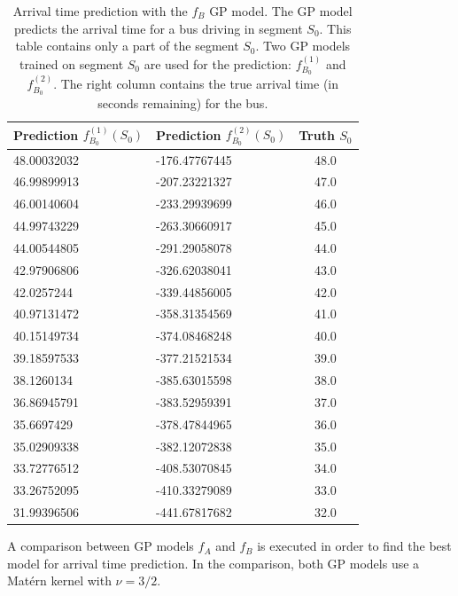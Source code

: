 \begin{table}
    \centering
    \caption[Arrival time prediction with the $f_B$ GP model]%
    {{\small Arrival time prediction with the $f_B$ GP model.
    The GP model predicts the arrival time for a bus driving in segment $S_0$.
    This table contains only a part of the segment $S_0$.
    Two GP models trained on segment $S_0$ are used for the prediction: $f^{(1)}_{B_0}$ and $f^{(2)}_{B_0}$.
    The right column contains the true arrival time (in seconds remaining) for the bus.}}
    \label{table:f_B-examples} 
    \begin{tabular}{ |l|l|c| } 
        \hline
        Prediction $f^{(1)}_{B_0}(S_0)$ & Prediction $f^{(2)}_{B_0}(S_0)$ & Truth $S_0$ \\ [0.5ex] 
        \hline
        48.00032032 & -176.47767445 & 48.0 \\
        46.99899913 & -207.23221327 & 47.0 \\
        46.00140604 & -233.29939699 & 46.0 \\
        44.99743229 & -263.30660917 & 45.0 \\
        44.00544805 & -291.29058078 & 44.0 \\
        42.97906806 & -326.62038041 & 43.0 \\
        42.0257244 & -339.44856005 & 42.0 \\
        40.97131472 & -358.31354569 & 41.0 \\
        40.15149734 & -374.08468248 & 40.0 \\
        39.18597533 & -377.21521534 & 39.0 \\
        38.1260134 & -385.63015598 & 38.0 \\
        36.86945791 & -383.52959391 & 37.0 \\
        35.6697429 & -378.47844965 & 36.0 \\
        35.02909338 & -382.12072838 & 35.0 \\
        33.72776512 & -408.53070845 & 34.0 \\
        33.26752095 & -410.33279089 & 33.0 \\
        31.99396506 & -441.67817682 & 32.0 \\ 
        \hline
    \end{tabular}
\end{table}

A comparison between GP models $f_A$ and $f_B$ is executed in order to find the best model for arrival time prediction.
In the comparison, both GP models use a Matérn kernel with $\nu =3/2$.


